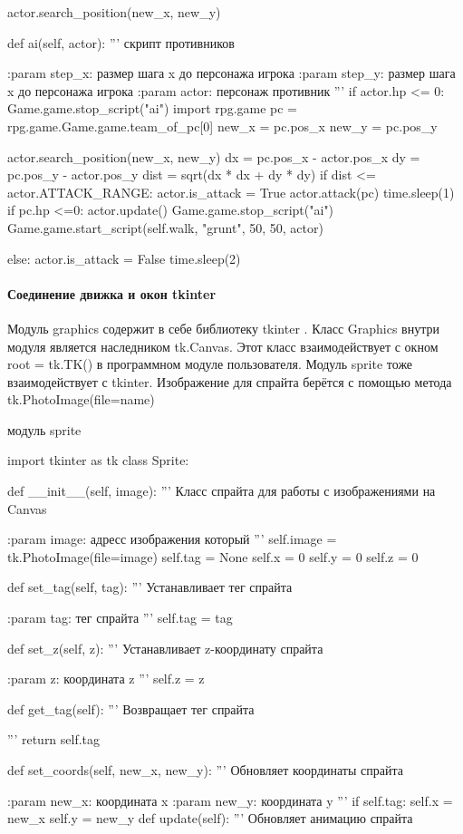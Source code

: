 actor.search\_position(new\_x, new\_y)

def ai(self, actor):
'''
скрипт противников

:param step\_x: размер шага x до персонажа игрока
:param step\_y: размер шага x до персонажа игрока
:param actor: персонаж противник
'''
if actor.hp <= 0:
Game.game.stop\_script("ai")
import rpg.game
pc = rpg.game.Game.game.team\_of\_pc[0]
new\_x = pc.pos\_x
new\_y = pc.pos\_y

actor.search\_position(new\_x, new\_y)
dx = pc.pos\_x - actor.pos\_x
dy = pc.pos\_y - actor.pos\_y
dist = sqrt(dx * dx + dy * dy)
if dist <= actor.ATTACK\_RANGE:
actor.is\_attack = True
actor.attack(pc)
time.sleep(1)
if pc.hp <=0:
actor.update()
Game.game.stop\_script("ai")
Game.game.start\_script(self.walk, "grunt", 50, 50, actor)

else:
actor.is\_attack = False
time.sleep(2)

\paragraph{Соединение движка и окон tkinter}
Модуль graphics содержит в себе библиотеку tkinter . Класс Graphics внутри модуля является наследником tk.Canvas. Этот класс взаимодействует с окном root = tk.TK() в программном модуле пользователя. Модуль sprite тоже взаимодействует с tkinter. Изображение для спрайта берётся с помощью метода tk.PhotoImage(file=name)

модуль sprite

import tkinter as tk
class Sprite:

def \_\_init\_\_(self, image):
'''
Класс спрайта для работы с изображениями на Canvas

:param image: адресс изображения который
'''
self.image = tk.PhotoImage(file=image)
self.tag = None
self.x = 0
self.y = 0
self.z = 0

def set\_tag(self, tag):
'''
Устанавливает тег спрайта

:param tag: тег спрайта
'''
self.tag = tag

def set\_z(self, z):
'''
Устанавливает z-координату спрайта

:param z: координата z
'''
self.z = z

def get\_tag(self):
'''
Возвращает тег спрайта

'''
return self.tag

def set\_coords(self, new\_x, new\_y):
'''
Обновляет координаты спрайта

:param new\_x: координата x
:param new\_y: координата y
'''
if self.tag:
self.x = new\_x
self.y = new\_y
def update(self):
'''
Обновляет анимацию спрайта

